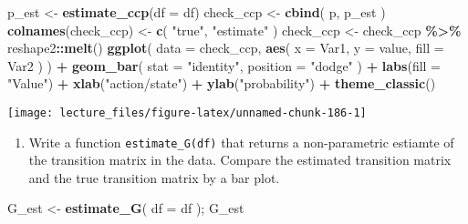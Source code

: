 \documentclass[
]{book}
\newenvironment{Shaded}{\begin{snugshade}}{\end{snugshade}}
\newcommand{\AttributeTok}[1]{\textcolor[rgb]{0.13,0.29,0.53}{#1}}
\newcommand{\FunctionTok}[1]{\textcolor[rgb]{0.13,0.29,0.53}{\textbf{#1}}}
\newcommand{\NormalTok}[1]{#1}
\newcommand{\OtherTok}[1]{\textcolor[rgb]{0.56,0.35,0.01}{#1}}
\newcommand{\SpecialCharTok}[1]{\textcolor[rgb]{0.81,0.36,0.00}{\textbf{#1}}}
\newcommand{\StringTok}[1]{\textcolor[rgb]{0.31,0.60,0.02}{#1}}
\providecommand{\tightlist}{%
  \setlength{\itemsep}{0pt}\setlength{\parskip}{0pt}}
\begin{document}
\begin{Shaded}
\begin{Highlighting}[]
\NormalTok{p\_est }\OtherTok{\textless{}{-}} \FunctionTok{estimate\_ccp}\NormalTok{(}\AttributeTok{df =}\NormalTok{ df)}
\NormalTok{check\_ccp }\OtherTok{\textless{}{-}} 
  \FunctionTok{cbind}\NormalTok{(}
\NormalTok{    p, }
\NormalTok{    p\_est}
\NormalTok{    )}
\FunctionTok{colnames}\NormalTok{(check\_ccp) }\OtherTok{\textless{}{-}} 
  \FunctionTok{c}\NormalTok{(}
    \StringTok{"true"}\NormalTok{, }
    \StringTok{"estimate"}
\NormalTok{    )}
\NormalTok{check\_ccp }\OtherTok{\textless{}{-}} 
\NormalTok{  check\_ccp }\SpecialCharTok{\%\textgreater{}\%}
\NormalTok{  reshape2}\SpecialCharTok{::}\FunctionTok{melt}\NormalTok{()}
\FunctionTok{ggplot}\NormalTok{(}
  \AttributeTok{data =}\NormalTok{ check\_ccp, }
  \FunctionTok{aes}\NormalTok{(}
    \AttributeTok{x =}\NormalTok{ Var1, }
    \AttributeTok{y =}\NormalTok{ value, }
    \AttributeTok{fill =}\NormalTok{ Var2}
\NormalTok{    )}
\NormalTok{  ) }\SpecialCharTok{+}
  \FunctionTok{geom\_bar}\NormalTok{(}
    \AttributeTok{stat =} \StringTok{"identity"}\NormalTok{, }
    \AttributeTok{position =} \StringTok{"dodge"}
\NormalTok{    ) }\SpecialCharTok{+}
  \FunctionTok{labs}\NormalTok{(}\AttributeTok{fill =} \StringTok{"Value"}\NormalTok{) }\SpecialCharTok{+} 
  \FunctionTok{xlab}\NormalTok{(}\StringTok{"action/state"}\NormalTok{) }\SpecialCharTok{+} 
  \FunctionTok{ylab}\NormalTok{(}\StringTok{"probability"}\NormalTok{)  }\SpecialCharTok{+} 
  \FunctionTok{theme\_classic}\NormalTok{()}
\end{Highlighting}
\end{Shaded}

\begin{center}\texttt{[image: lecture\_files/figure-latex/unnamed-chunk-186-1]} \end{center}

\begin{enumerate}
\def\labelenumi{\arabic{enumi}.}
\setcounter{enumi}{9}
\tightlist
\item
  Write a function \texttt{estimate\_G(df)} that returns a non-parametric estiamte of the transition matrix in the data. Compare the estimated transition matrix and the true transition matrix by a bar plot.
\end{enumerate}

\begin{Shaded}
\begin{Highlighting}[]
\NormalTok{G\_est }\OtherTok{\textless{}{-}} 
  \FunctionTok{estimate\_G}\NormalTok{(}
    \AttributeTok{df =}\NormalTok{ df}
\NormalTok{  ); }
\NormalTok{G\_est}
\end{Highlighting}
\end{Shaded}
\end{document}
